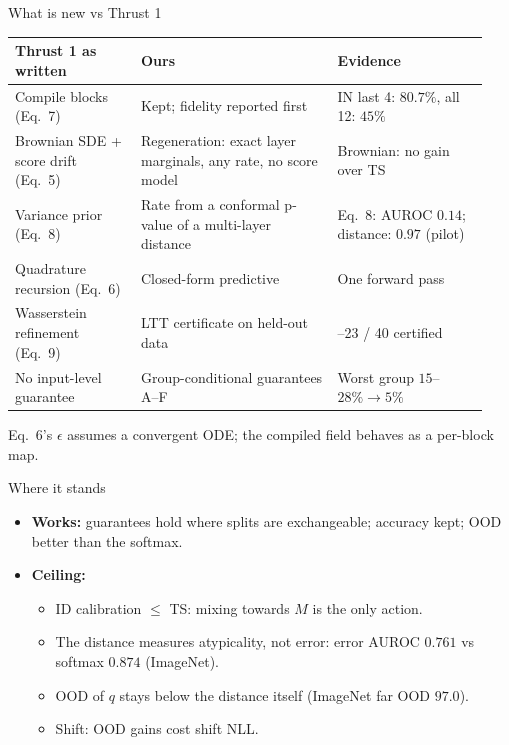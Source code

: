 \documentclass[aspectratio=169,11pt]{beamer}
\newcommand{\source}[1]{\par\vfill{\scriptsize\color{inkgrey}#1}}
\begin{document}
\begin{frame}{What is new vs Thrust 1}
  \footnotesize
  \renewcommand{\arraystretch}{1.15}
  \begin{tabular}{@{}>{\raggedright\arraybackslash}p{0.25\linewidth}>{\raggedright\arraybackslash}p{0.39\linewidth}>{\raggedright\arraybackslash}p{0.30\linewidth}@{}}
    \toprule
    Thrust 1 as written & Ours & Evidence\\
    \midrule
    Compile blocks (Eq.~7) & Kept; fidelity reported first & IN last 4: $80.7\%$, all 12: $45\%$\\
    Brownian SDE + score drift (Eq.~5) & Regeneration: exact layer marginals, any rate, no score model & Brownian: no gain over TS\\
    Variance prior (Eq.~8) & Rate from a conformal p-value of a multi-layer distance & Eq.~8: AUROC $0.14$; distance: $0.97$ (pilot)\\
    Quadrature recursion (Eq.~6) & Closed-form predictive & One forward pass\\
    Wasserstein refinement (Eq.~9) & LTT certificate on held-out data & 21--23 / 40 certified\\
    No input-level guarantee & Group-conditional guarantees A--F & Worst group $15$--$28\%\to5\%$\\
    \bottomrule
  \end{tabular}
  \source{Eq.~6's $\epsilon$ assumes a convergent ODE; the compiled field behaves as a per-block map.}
\end{frame}

\begin{frame}{Where it stands}
  \small
  \begin{itemize}
    \item \textbf{Works:} guarantees hold where splits are exchangeable; accuracy kept; OOD better than the softmax.
    \item \textbf{Ceiling:}
      \begin{itemize}\small
        \item ID calibration $\le$ TS: mixing towards $M$ is the only action.
        \item The distance measures atypicality, not error: error AUROC $0.761$ vs softmax $0.874$ (ImageNet).
        \item OOD of $q$ stays below the distance itself (ImageNet far OOD $97.0$).
        \item Shift: OOD gains cost shift NLL.
      \end{itemize}
  \end{itemize}
  \medskip
  \centering
\end{frame}
\end{document}

